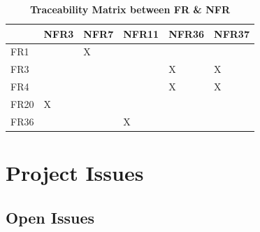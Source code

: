 \documentclass[12pt, titlepage]{article}
\begin{document}
	\begin{table}[H]
		\caption{\textbf{Traceability Matrix between FR \& NFR}}
		\begin{tabular}{l|l|l|l|l|l|}
			\cline{2-6}
			& NFR3  & NFR7 & NFR11 & NFR36 & NFR37 \\ \hline
			\multicolumn{1}{|l|}{FR1}  &  & X &  &  &  \\ \hline
			\multicolumn{1}{|l|}{FR3}  &  &  &  & X & X \\ \hline
			\multicolumn{1}{|l|}{FR4}  &  &  &  & X & X \\ \hline
			\multicolumn{1}{|l|}{FR20}  & X &  &  &  &  \\ \hline
			\multicolumn{1}{|l|}{FR36}  &  &  & X &  &  \\ \hline
		\end{tabular}
	\end{table}
	
	
	\section{Project Issues}
	
	\subsection{Open Issues}
	
\end{document}
